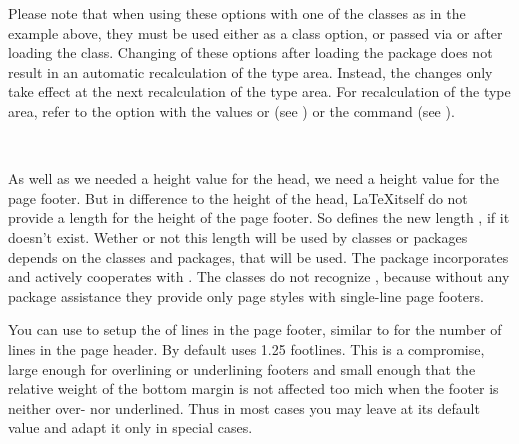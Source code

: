 Please note that when using these options with one of the
{\KOMAScript} classes as in the example above, they must be used
either as a class option, or passed via  or
 after loading the class. Changing of these options
after loading the  package does not result in an
automatic recalculation of the type area. Instead, the changes only
take effect at the next recalculation of the type area. For
recalculation of the type area, refer to the  option with
the values  or  (see
) or the
 command (see
).%
%
%

\begin{Declaration}
  \\
\end{Declaration}
%
%
As well as we needed a height value for
the head, we need a height value for the page footer. But in difference to the
height of the head, \LaTeX itself do not provide a length for the height of
the page footer. So  defines the new length
, if it doesn't
exist. Wether or not this length will be used by classes or packages depends
on the classes and packages, that will be used. The \KOMAScript{} package
 incorporates  and actively
cooperates with . The \KOMAScript{} classes do not recognize
, because without any package assistance they provide only
page styles with single-line page footers.

You can use  to setup the  of lines in the
page footer, similar to  for the number of lines in the page
header. By default  uses 1.25 footlines. This is a
compromise, large enough for overlining or underlining footers and small
enough that the relative weight of the bottom margin is not affected too mich
when the footer is neither over- nor underlined. Thus in most cases you may
leave  at its default value and adapt it only in special
cases.

